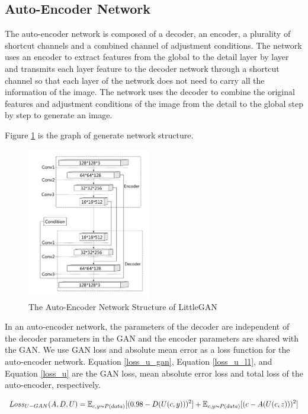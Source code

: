 \subsection{Auto-Encoder Network}
The auto-encoder network is composed of a decoder, an encoder, a plurality of shortcut channels and a combined channel of adjustment conditions.
The network uses an encoder to extract features from the global to the detail layer by layer and transmits each layer feature to the decoder network through a shortcut channel so that each layer of the network does not need to carry all the information of the image.
The network uses the decoder to combine the original features and adjustment conditions of the image from the detail to the global step by step to generate an image.

Figure \ref{net_auto-encoder} is the graph of generate network structure.

\begin{figure}
    \begin{center}
    \includegraphics[width=0.48\textwidth]{figures/net_auto-encoder.pdf}
    \caption{The Auto-Encoder Network Structure of LittleGAN}
    \label{net_auto-encoder}
    \end{center}
\end{figure}

In an auto-encoder network, the parameters of the decoder are independent of the decoder parameters in the GAN and the encoder parameters are shared with the GAN.
We use GAN loss and absolute mean error as a loss function for the auto-encoder network.
Equation \eqref{loss_u_gan}, Equation \eqref{loss_u_l1}, and Equation \eqref{loss_u} are the GAN loss, mean absolute error loss and total loss of the auto-encoder, respectively.

\begin{equation}
    Loss_{U-GAN}(A,D,U)=
    \mathbb{E}_{c,y\thicksim P(data)}[(0.98-D(U(c,y)))^2]+
    \mathbb{E}_{c,y\thicksim P(data)}[(c-A(U(c,z)))^2]
    \label{loss_u_gan}
\end{equation}

